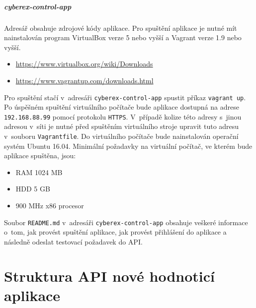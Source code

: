 \documentclass[
  digital,
  twoside,
  table, 
  nolof, 
  nolot
]{fithesis3}
\begin{document}
\paragraph{cyberex-control-app} Adresář obsahuje zdrojové kódy aplikace. Pro spuštění aplikace je nutné mít nainstalován program VirtualBox verze 5 nebo vyšší a Vagrant verze 1.9 nebo vyšší.
\begin{itemize}
    \item \url{https://www.virtualbox.org/wiki/Downloads}
    \item \url{https://www.vagrantup.com/downloads.html}
\end{itemize}
Pro spuštění stačí v~adresáři \texttt{cyberex-control-app} spustit příkaz \texttt{vagrant up}.
Po úspěšném spuštění virtuálního počítače bude aplikace dostupná na adrese
\texttt{192.168.88.99} pomocí protokolu \texttt{HTTPS}. V~případě kolize této adresy s~jinou adresou v~síti je nutné
před spuštěním virtuálního stroje upravit tuto adresu v~souboru \texttt{Vagrantfile}.
Do virtuálního počítače bude nainstalován operační systém Ubuntu 16.04.
Minimální požadavky na virtuální počítač, ve kterém bude aplikace spuštěna,
jsou:
\begin{itemize}
    \item RAM 1024 MB
    \item HDD 5 GB
    \item 900 MHz x86 procesor
\end{itemize}
Soubor \texttt{README.md} v~adresáři \texttt{cyberex-control-app} obsahuje veškeré informace o~tom, jak provést spuštění aplikace, jak provést přihlášení do aplikace a následně odeslat testovací požadavek do API.

\chapter{Struktura API nové hodnoticí aplikace}
\label{appendAPI}
\end{document}
